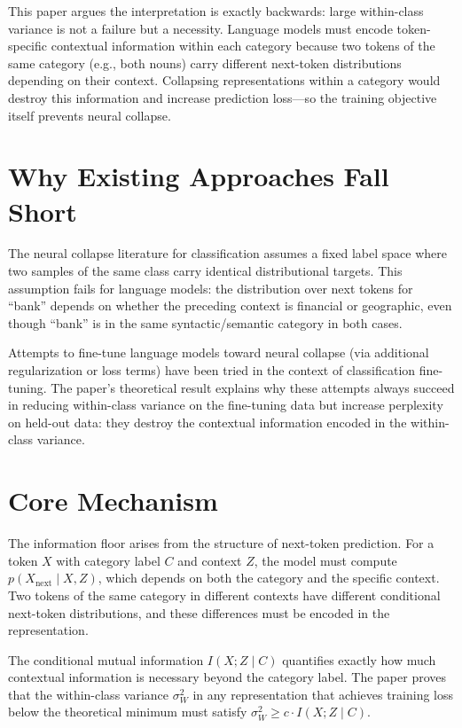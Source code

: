 \documentclass[10pt,twocolumn]{article}
\begin{document}
This paper argues the interpretation is exactly backwards: large
within-class variance is not a failure but a necessity. Language models
must encode token-specific contextual information within each category
because two tokens of the same category (e.g., both nouns) carry
different next-token distributions depending on their context.
Collapsing representations within a category would destroy this
information and increase prediction loss---so the training objective
itself prevents neural collapse.

\section{Why Existing Approaches Fall Short}

The neural collapse literature for classification assumes a fixed
label space where two samples of the same class carry identical
distributional targets. This assumption fails for language models:
the distribution over next tokens for ``bank'' depends on whether
the preceding context is financial or geographic, even though ``bank''
is in the same syntactic/semantic category in both cases.

Attempts to fine-tune language models toward neural collapse (via
additional regularization or loss terms) have been tried in the
context of classification fine-tuning. The paper's theoretical result
explains why these attempts always succeed in reducing within-class
variance on the fine-tuning data but increase perplexity on
held-out data: they destroy the contextual information encoded in
the within-class variance.

\section{Core Mechanism}

The information floor arises from the structure of next-token
prediction. For a token $X$ with category label $C$ and context $Z$,
the model must compute $p(X_{\text{next}} \mid X, Z)$, which depends
on both the category and the specific context. Two tokens of the same
category in different contexts have different conditional next-token
distributions, and these differences must be encoded in the
representation.

The conditional mutual information $I(X; Z \mid C)$ quantifies exactly
how much contextual information is necessary beyond the category label.
The paper proves that the within-class variance $\sigma^2_W$ in any
representation that achieves training loss below the theoretical
minimum must satisfy $\sigma^2_W \geq c \cdot I(X; Z \mid C)$.
\end{document}
